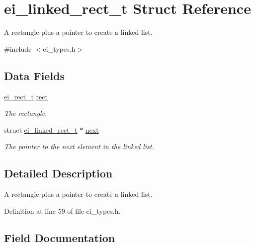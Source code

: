 \hypertarget{structei__linked__rect__t}{}\section{ei\+\_\+linked\+\_\+rect\+\_\+t Struct Reference}
\label{structei__linked__rect__t}


A rectangle plus a pointer to create a linked list.  




{\ttfamily \#include $<$ei\+\_\+types.\+h$>$}

\subsection*{Data Fields}
\begin{DoxyCompactItemize}
\item 
\hyperlink{structei__rect__t}{ei\+\_\+rect\+\_\+t} \hyperlink{structei__linked__rect__t_ae7fa184a482756ca81a340de0775cc8b}{rect}
\begin{DoxyCompactList}\small\item\em The rectangle. \end{DoxyCompactList}\item 
struct \hyperlink{structei__linked__rect__t}{ei\+\_\+linked\+\_\+rect\+\_\+t} $\ast$ \hyperlink{structei__linked__rect__t_ad31a83bb4babee5aaae18ccedad52755}{next}
\begin{DoxyCompactList}\small\item\em The pointer to the next element in the linked list. \end{DoxyCompactList}\end{DoxyCompactItemize}


\subsection{Detailed Description}
A rectangle plus a pointer to create a linked list. 

Definition at line 59 of file ei\+\_\+types.\+h.



\subsection{Field Documentation}
\mbox{\label{structei__linked__rect__t_ad31a83bb4babee5aaae18ccedad52755}} 
